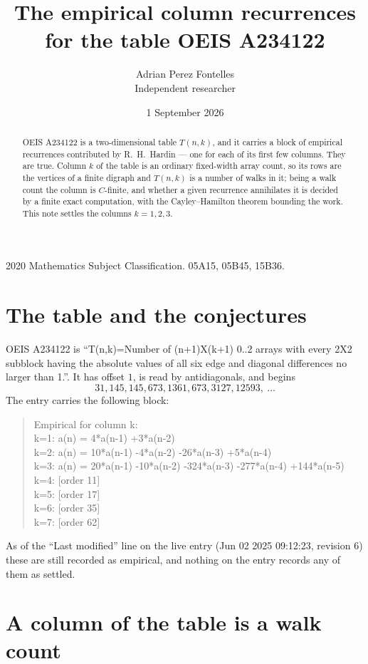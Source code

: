 \documentclass[11pt,a4paper]{article}
\title{The empirical column recurrences for the table OEIS A234122}
\author{Adrian Perez Fontelles\\ \small Independent researcher}
\date{1 September 2026}
\theoremstyle{plain}
\theoremstyle{definition}
\begin{document}
\maketitle

\begin{abstract}
OEIS A234122 is a two-dimensional table $T(n,k)$, and it carries a block of empirical
recurrences contributed by R.~H.~Hardin --- one for each of its first few columns. They are
true. Column $k$ of the table is an ordinary fixed-width array count, so its rows are the
vertices of a finite digraph and $T(n,k)$ is a number of walks in it; being a walk count the
column is $C$-finite, and whether a given recurrence annihilates it is decided by a finite
exact computation, with the Cayley--Hamilton theorem bounding the work. This note settles the columns $k=1, 2, 3$.
\end{abstract}

\noindent\small 2020 Mathematics Subject Classification. 05A15, 05B45, 15B36.\normalsize

\section{The table and the conjectures}

OEIS A234122 is ``T(n,k)=Number of (n+1)X(k+1) 0..2 arrays with every 2X2 subblock having the absolute values of all six edge and diagonal differences no larger than 1.''. It has offset $1$, is
read by antidiagonals, and begins
\[
31, 145, 145, 673, 1361, 673, 3127, 12593,\ \dots
\]
The entry carries the following block:
\begin{quote}\small
Empirical for column k:\\
k=1: a(n) = 4*a(n-1) +3*a(n-2)\\
k=2: a(n) = 10*a(n-1) -4*a(n-2) -26*a(n-3) +5*a(n-4)\\
k=3: a(n) = 20*a(n-1) -10*a(n-2) -324*a(n-3) -277*a(n-4) +144*a(n-5)\\
k=4: [order 11]\\
k=5: [order 17]\\
k=6: [order 35]\\
k=7: [order 62]\\
\end{quote}
As of the ``Last modified'' line on the live entry (Jun 02 2025 09:12:23, revision 6) these are still
recorded as empirical, and nothing on the entry records any of them as settled.

\section{A column of the table is a walk count}
\end{document}
